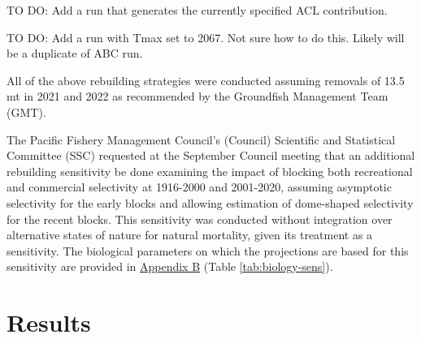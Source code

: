 \documentclass[11pt,
  english,
  a4paper,
]{article}
\begin{document}

TO DO: Add a run that generates the currently specified ACL contribution.

\leavevmode\tagmcend\tagstructend\par


TO DO: Add a run with Tmax set to 2067. Not sure how to do this. Likely will be a duplicate of ABC run.

\leavevmode\tagmcend\tagstructend\par


All of the above rebuilding strategies were conducted assuming removals of 13.5 mt in 2021 and 2022 as recommended by the Groundfish Management Team (GMT).

\leavevmode\tagmcend\tagstructend\par


The Pacific Fishery Management Council's (Council) Scientific and Statistical Committee (SSC) requested at the September Council meeting that an additional rebuilding sensitivity be done examining the impact of blocking both recreational and commercial selectivity at 1916-2000 and 2001-2020, assuming asymptotic selectivity for the early blocks and allowing estimation of dome-shaped selectivity for the recent blocks. This sensitivity was conducted without integration over alternative states of nature for natural mortality, given its treatment as a sensitivity. The biological parameters on which the projections are based for this sensitivity are provided in {\protect\hyperlink{append_b}{Appendix B}\leavevmode\tagmcend\tagstructend} (Table \ref{tab:biology-sens}).

\leavevmode\tagmcend\tagstructend\par


\hypertarget{results}{%
\section{Results}\label{results}}

\leavevmode\tagmcend\tagstructend

\end{document}
